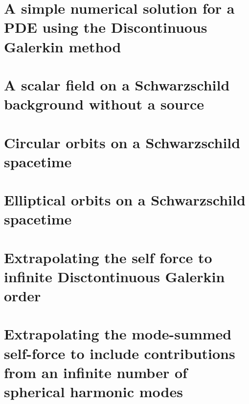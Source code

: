 \documentclass[12pt,letterpaper]{lsuetd}
\begin{document}
\chapter{A simple numerical solution for a PDE using the Discontinuous Galerkin method}
\doublespacing

\pagebreak
\singlespacing
\chapter{A scalar field on a Schwarzschild background without a source}
\doublespacing

\pagebreak
\singlespacing
\chapter{Circular orbits on a Schwarzschild spacetime}
\doublespacing

\pagebreak
\singlespacing
\chapter{Elliptical orbits on a Schwarzschild spacetime}
\doublespacing

\pagebreak
\singlespacing
\chapter{Extrapolating the self force to infinite Disctontinuous Galerkin order}
\doublespacing

\pagebreak
\singlespacing
\chapter{Extrapolating the mode-summed self-force to include contributions from an infinite number of spherical harmonic modes}
\doublespacing

\pagebreak
\singlespacing
\end{document}
